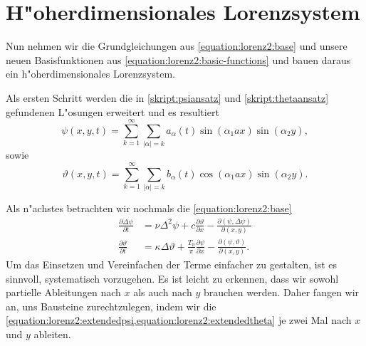 \section{H"oherdimensionales Lorenzsystem\label{section:lorenz2:ho-model}}
Nun nehmen wir die Grundgleichungen aus \eqref{equation:lorenz2:base} und unsere 
neuen Basisfunktionen aus \eqref{equation:lorenz2:basic-functions} und bauen 
daraus ein h"oherdimensionales Lorenzsystem.

Als ersten Schritt werden die in \cref{skript:psiansatz} und 
\cref{skript:thetaansatz} gefundenen L"osungen erweitert und es resultiert
\begin{equation}
\psi(x,y,t) =
\sum_{k = 1}^{\infty}
\sum_{|\alpha| = k}
a_{\alpha}(t)
\sin(\alpha_1 ax) \sin(\alpha_2 y),
\label{equation:lorenz2:extendedpsi}
\end{equation}
sowie
\begin{equation}
\vartheta(x,y,t) =
\sum_{k = 1}^{\infty}
\sum_{|\alpha| = k}
b_{\alpha}(t)
\cos(\alpha_1 ax) \sin(\alpha_2 y).
\label{equation:lorenz2:extendedtheta}
\end{equation}

Als n"achstes betrachten wir nochmals die \cref{equation:lorenz2:base}
\begin{align*}
\frac{\partial\Delta\psi}{\partial t}
&=
\nu\Delta^2\psi 
+c\frac{\partial\vartheta}{\partial x}
-\frac{\partial(\psi,\Delta\psi)}{\partial(x,y)}
\\
\frac{\partial\vartheta}{\partial t}
&=
\kappa\Delta\vartheta
+ \frac{T_0}{\pi}\frac{\partial\psi}{\partial x}
- \frac{\partial(\psi,\vartheta)}{\partial(x,y)}.
\end{align*}
Um das Einsetzen und Vereinfachen der Terme einfacher zu gestalten, ist es 
sinnvoll, systematisch vorzugehen. Es ist leicht zu erkennen, dass wir sowohl 
partielle Ableitungen nach $x$ als auch nach $y$ brauchen werden. Daher fangen 
wir an, uns Bausteine zurechtzulegen, indem wir die 
\cref{equation:lorenz2:extendedpsi,equation:lorenz2:extendedtheta} 
je zwei Mal nach $x$ und $y$ ableiten.

